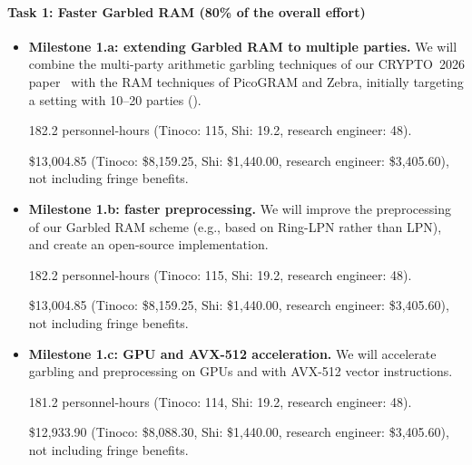 \paragraph{Task 1: Faster Garbled RAM (80\% of the overall effort)}
\begin{itemize}
\item {\bf Milestone 1.a: extending Garbled RAM to multiple parties.}
We will combine the multi-party arithmetic garbling techniques of our
CRYPTO~2026 paper~\cite{mparithgarble} with the RAM techniques of PicoGRAM
and Zebra, initially targeting a setting with 10--20 parties
().

\vspace{5pt}
 182.2 personnel-hours (Tinoco: 115,
Shi: 19.2, research engineer: 48).

\vspace{5pt}
 \$13,004.85 (Tinoco: \$8,159.25, Shi: \$1,440.00,
research engineer: \$3,405.60), not including fringe benefits.

\item {\bf Milestone 1.b: faster preprocessing.}
We will improve the preprocessing 
of our Garbled RAM scheme (e.g., based on Ring-LPN 
rather than LPN), and create an open-source implementation.

\vspace{5pt}
 182.2 personnel-hours (Tinoco: 115,
Shi: 19.2, research engineer: 48).

\vspace{5pt}
 \$13,004.85 (Tinoco: \$8,159.25, Shi: \$1,440.00,
research engineer: \$3,405.60), not including fringe benefits.

\item {\bf Milestone 1.c: GPU and AVX-512 acceleration.}
We will accelerate garbling and preprocessing on GPUs and with AVX-512
vector instructions. 

\vspace{5pt}
 181.2 personnel-hours (Tinoco: 114,
Shi: 19.2, research engineer: 48).

\vspace{5pt}
 \$12,933.90 (Tinoco: \$8,088.30, Shi: \$1,440.00,
research engineer: \$3,405.60), not including fringe benefits.
\end{itemize}

